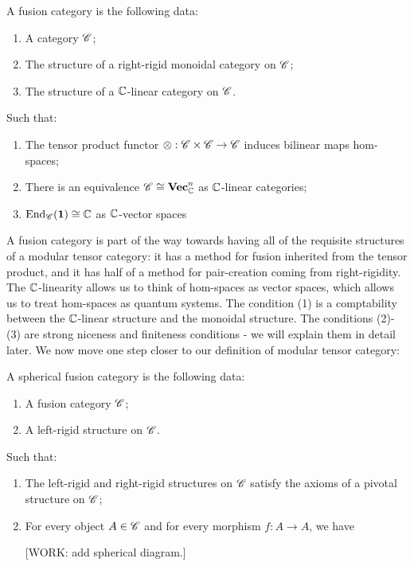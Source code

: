 \begin{definition} A fusion category is the following data:

\begin{enumerate}
\item A category $\mathscr{C}$;
\item The structure of a right-rigid monoidal category on $\mathscr{C}$;
\item The structure of a $\mathbb{C}$-linear category on $\mathscr{C}$.
\end{enumerate}

Such that:

\begin{enumerate}
\item The tensor product functor $\otimes: \mathscr{C}\times \mathscr{C}\to \mathscr{C}$ induces bilinear maps hom-spaces;
\item There is an equivalence $\mathscr{C} \cong \mathbf{Vec}_{\mathbb{C}}^n$ as $\mathbb{C}$-linear categories;
\item $\operatorname{End}_{\mathscr{C}}(\mathbf{1})\cong \mathbb{C}$ as $\mathbb{C}$-vector spaces
\end{enumerate}

\raggedleft\qedsymbol{}
\end{definition}

A fusion category is part of the way towards having all of the requisite structures of a modular tensor category: it has a method for fusion inherited from the tensor product, and it has half of a method for pair-creation coming from right-rigidity. The $\mathbb{C}$-linearity allows us to think of hom-spaces as vector spaces, which allows us to treat hom-spaces as quantum systems. The condition (1) is a comptability between the $\mathbb{C}$-linear structure and the monoidal structure. The conditions (2)-(3) are strong niceness and finiteness conditions - we will explain them in detail later. We now move one step closer to our definition of modular tensor category:

\begin{definition} A spherical fusion category is the following data:

\begin{enumerate}
\item A fusion category $\mathscr{C}$;
\item A left-rigid structure on $\mathscr{C}$.
\end{enumerate}

Such that:

\begin{enumerate}
\item The left-rigid and right-rigid structures on $\mathscr{C}$ satisfy the axioms of a pivotal structure on $\mathscr{C}$;
\item For every object $A\in \mathscr{C}$ and for every morphism $f: A \to A$, we have

[WORK: add spherical diagram.]
\end{enumerate}

\raggedleft\qedsymbol{}
\end{definition}

